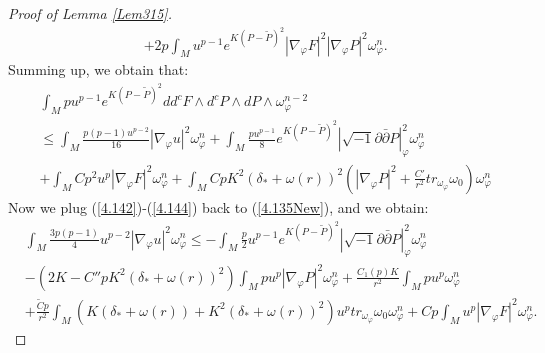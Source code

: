 \documentclass[10pt,a4paper]{amsart}
\begin{document}
\begin{proof}[Proof of Lemma \ref{Lem315}]
\begin{equation*}
\begin{split}
&+2p\int_Mu^{p-1}e^{K(P-\tilde{P})^2}|\nabla_{\varphi}F|^2|\nabla_{\varphi}P|^2\omega_{\varphi}^n.
\end{split}
\end{equation*}
Summing up,  we obtain that:
\begin{equation}\label{4.144}
\begin{split}
&\int_Mpu^{p-1}e^{K(P-\tilde{P})^2}dd^cF\wedge d^cP\wedge dP\wedge \omega_{\varphi}^{n-2}\\
&\le \int_M\frac{p(p-1)u^{p-2}}{16}|\nabla_{\varphi}u|^2\omega_{\varphi}^n+\int_M\frac{pu^{p-1}}{8}e^{K(P-\tilde{P})^2}|\sqrt{-1}\partial\bar{\partial}P|^2_{\varphi}\omega_{\varphi}^n\\
&+\int_MCp^2u^p|\nabla_{\varphi}F|^2\omega_{\varphi}^n+\int_MCpK^2(\delta_*+\omega(r))^2(|\nabla_{\varphi}P|^2+\frac{C'}{r^2}tr_{\omega_{\varphi}}\omega_0)\omega_{\varphi}^n
\end{split}
\end{equation}
Now we plug (\ref{4.142})-(\ref{4.144}) back to (\ref{4.135New}),  and we obtain:
\begin{equation}
\begin{split}
&\int_M\frac{3p(p-1)}{4}u^{p-2}|\nabla_{\varphi}u|^2\omega_{\varphi}^n\le -\int_M\frac{p}{2}u^{p-1}e^{K(P-\tilde{P})^2}|\sqrt{-1}\partial\bar{\partial}P|^2_{\varphi}\omega_{\varphi}^n\\
&-(2K-C''pK^2(\delta_*+\omega(r))^2)\int_Mpu^p|\nabla_{\varphi}P|^2\omega_{\varphi}^n+\frac{C_1(p)K}{r^2}\int_Mpu^p\omega_{\varphi}^n\\
&+\frac{\tilde{C}p}{r^2}\int_M(K(\delta_*+\omega(r))+K^2(\delta_*+\omega(r))^2)u^ptr_{\omega_{\varphi}}\omega_0\omega_{\varphi}^n+Cp\int_Mu^p|\nabla_{\varphi}F|^2\omega_{\varphi}^n.
\end{split}
\end{equation}


\end{proof}
\end{document}
